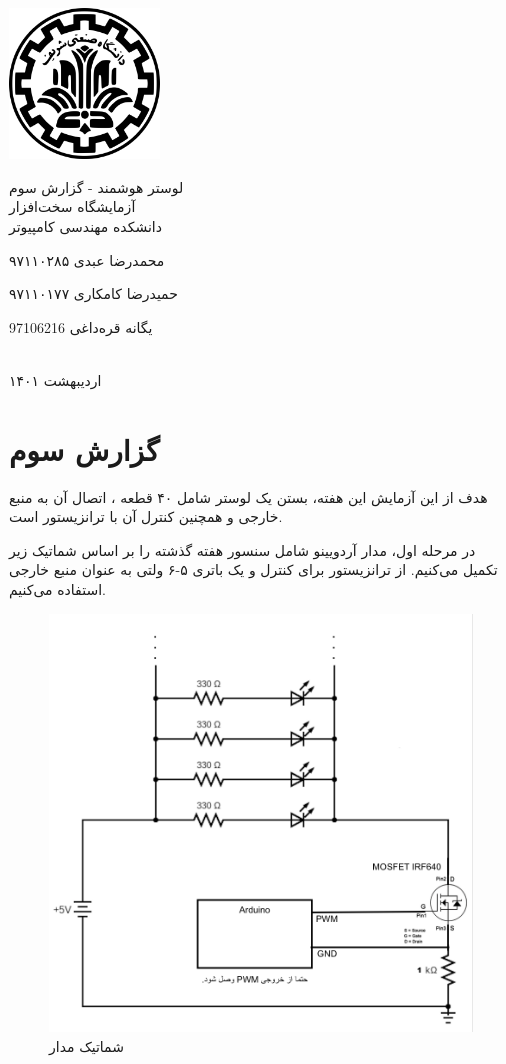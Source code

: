 \documentclass[12pt,a4paper]{article}
\begin{document}
	\thispagestyle{empty}
	\vspace*{0mm}
	\centerline{\includegraphics[height=4cm]{logo.png}}
	\vspace*{5mm}
	\begin{center}
		{\Huge
لوستر هوشمند - گزارش سوم
}
\\[1cm]
آزمایشگاه سخت‌افزار
\\[1cm]
دانشکده مهندسی کامپیوتر
\\[4cm]
{\large
محمدرضا عبدی ۹۷۱۱۰۲۸۵

حمیدرضا کامکاری ۹۷۱۱۰۱۷۷

یگانه قره‌داغی 97106216
}
	\\[5cm]
	اردیبهشت ۱۴۰۱
	\end{center}
\newpage

\section*{گزارش سوم}
هدف از این آزمایش این هفته، بستن یک لوستر شامل ۴۰ قطعه ، اتصال آن به منبع خارجی و همچنین کنترل آن با ترانزیستور است.

در مرحله اول، مدار آردویینو شامل سنسور هفته گذشته را بر اساس شماتیک زیر تکمیل می‌کنیم. از ترانزیستور  برای کنترل و یک باتری ۵-۶ ولتی به عنوان منبع خارجی استفاده می‌کنیم.

 \begin{figure}[H]
 	\centering
 	\includegraphics[scale=0.7]{figs/schematics.png}
 	\caption{
 		شماتیک مدار
 	}
 	\label{fig:schema}
 \end{figure}
 
\end{document}
